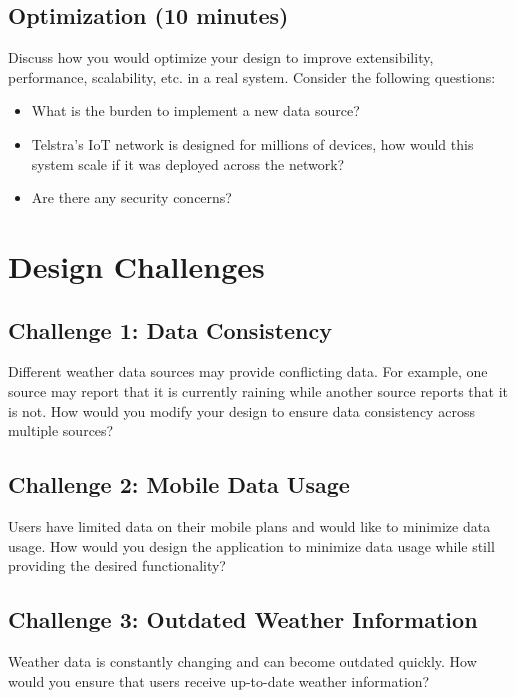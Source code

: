 \documentclass{csse4400}
\begin{document}
\subsection*{Optimization (10 minutes)}
Discuss how you would optimize your design to improve extensibility, performance, scalability, etc. in a real system.
Consider the following questions:
\begin{itemize}
\item What is the burden to implement a new data source?
\item Telstra's IoT network is designed for millions of devices, how would this system scale if it was deployed across the network?
\item Are there any security concerns?
\end{itemize}

\section{Design Challenges}

\subsection*{Challenge 1: Data Consistency}
Different weather data sources may provide conflicting data.
For example, one source may report that it is currently raining while another source reports that it is not.
How would you modify your design to ensure data consistency across multiple sources?

\subsection*{Challenge 2: Mobile Data Usage}
Users have limited data on their mobile plans and would like to minimize data usage.
How would you design the application to minimize data usage while still providing the desired functionality?

\subsection*{Challenge 3: Outdated Weather Information}
Weather data is constantly changing and can become outdated quickly.
How would you ensure that users receive up-to-date weather information?
\end{document}
